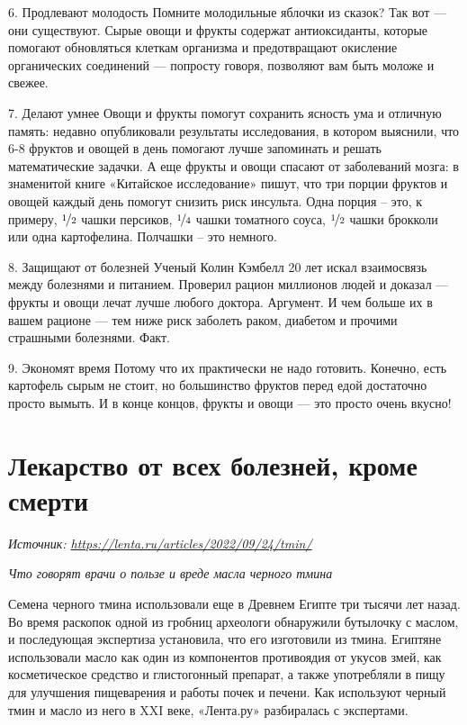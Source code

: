 6. Продлевают молодость Помните молодильные яблочки из сказок? Так вот — они существуют. Сырые овощи и фрукты содержат антиоксиданты, которые помогают обновляться клеткам организма и предотвращают окисление органических соединений — попросту говоря, позволяют вам быть моложе и свежее.

7. Делают умнее Овощи и фрукты помогут сохранить ясность ума и отличную память: недавно опубликовали результаты исследования, в котором выяснили, что 6-8 фруктов и овощей в день помогают лучше запоминать и решать математические задачки. А еще фрукты и овощи спасают от заболеваний мозга: в знаменитой книге «Китайское исследование» пишут, что три порции фруктов и овощей каждый день помогут снизить риск инсульта. Одна порция -- это, к примеру, $\nicefrac{1}{2}$ чашки персиков, $\nicefrac{1}{4}$ чашки томатного соуса, $\nicefrac{1}{2}$ чашки брокколи или одна картофелина. Полчашки -- это немного.

8. Защищают от болезней Ученый Колин Кэмбелл 20 лет искал взаимосвязь между болезнями и питанием. Проверил рацион миллионов людей и доказал — фрукты и овощи лечат лучше любого доктора. Аргумент. И чем больше их в вашем рационе — тем ниже риск заболеть раком, диабетом и прочими страшными болезнями. Факт.

9. Экономят время Потому что их практически не надо готовить. Конечно, есть картофель сырым не стоит, но большинство фруктов перед едой достаточно просто вымыть. И в конце концов, фрукты и овощи — это просто очень вкусно!



\section{Лекарство от всех болезней, кроме смерти}
\textit{Источник: \url{https://lenta.ru/articles/2022/09/24/tmin/}}

\textit{Что говорят врачи о пользе и вреде масла черного тмина}

Семена черного тмина использовали еще в Древнем Египте три тысячи лет назад. Во время раскопок одной из гробниц археологи обнаружили бутылочку с маслом, и последующая экспертиза установила, что его изготовили из тмина. Египтяне использовали масло как один из компонентов противоядия от укусов змей, как косметическое средство и глистогонный препарат, а также употребляли в пищу для улучшения пищеварения и работы почек и печени. Как используют черный тмин и масло из него в XXI веке, «Лента.ру» разбиралась с экспертами.

